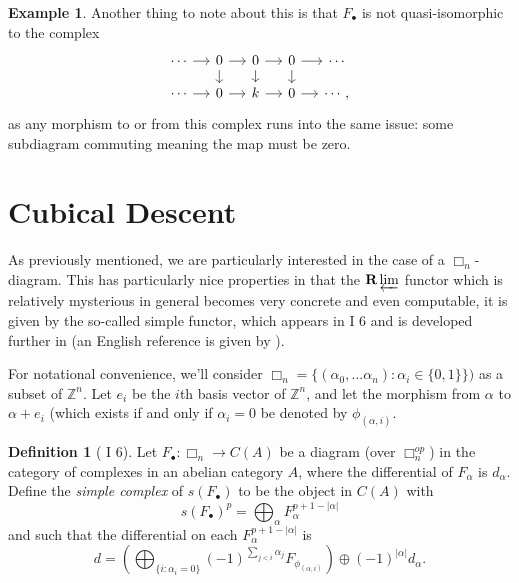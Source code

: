 \documentclass[proquest]{uwthesis}[2014/11/13]
\theoremstyle{definition}
\newtheorem{definition}[theorem]{Definition}
\newtheorem{example}[theorem]{Example}
\newcommand{\bR}{\textbf{R}}
\newcommand{\ZZ}{\mathbb{Z}}
\begin{document}
\begin{example}
	Another thing to note about this is that $F_\bullet$ is not quasi-isomorphic to the complex 
	\[
	\begin{tikzcd}[column sep = small, row sep = small]
	\cdots \ar[r] &  0 \ar[r] \ar[d] & 0 \ar{r} \ar{d} & 0 \ar[r] \ar[d] & \cdots \\
	\cdots \ar[r] & 0 \ar[r] & k \ar[r] & 0 \ar[r] & \cdots,
	\end{tikzcd}
	\]
	as any morphism to or from this complex runs into the same issue: some subdiagram commuting meaning the map must be zero.
\end{example}
	
\section{Cubical Descent}
\label{sec:cubicaldescent}

As previously mentioned, we are particularly interested in the case of a $\Box_n$-diagram.
This has particularly nice properties in that the $\bR \varprojlim$ functor which is relatively mysterious in general becomes very concrete and even computable, it is given by the so-called simple functor, which appears in \cite{Guillen1988} I 6 and is developed further in \cite{Guillen2002} (an English reference is given by \cite{Pascual2009}).

For notational convenience, we'll consider $\Box_n = \{(\alpha_0, \dots \alpha_n) : \alpha_i \in \{0, 1\}\})$ as a subset of $\ZZ^n$.
Let $e_i$ be the $i$th basis vector of $\ZZ^n$, and let the morphism from $\alpha$ to $\alpha + e_i$ (which exists if and only if $\alpha_i = 0$ be denoted by $\phi_{(\alpha, i)}$.

\begin{definition}[\cite{Guillen1988} I 6]
	Let $F_\bullet : \Box_n \rightarrow C(A)$ be a diagram (over $\Box_n^{op}$) in the category of complexes in an abelian category $A$, where the differential of $F_\alpha$ is $d_\alpha$.
	Define the {\it simple complex} of $s(F_\bullet)$ to be the object in $C(A)$ with
	\[
	s(F_\bullet)^p = \bigoplus_\alpha F_\alpha^{p+1-|\alpha|}
	\] 
	and such that the differential on each $F_\alpha^{p+1-|\alpha|}$ is
	\[
	d = (\bigoplus_{\{i : \alpha_i = 0\}} (-1)^{\sum_{j < i} \alpha_j} F_{\phi_{(\alpha, i)}}) \oplus (-1)^{|\alpha|} d_\alpha.
	\]
\end{definition}
\end{document}
